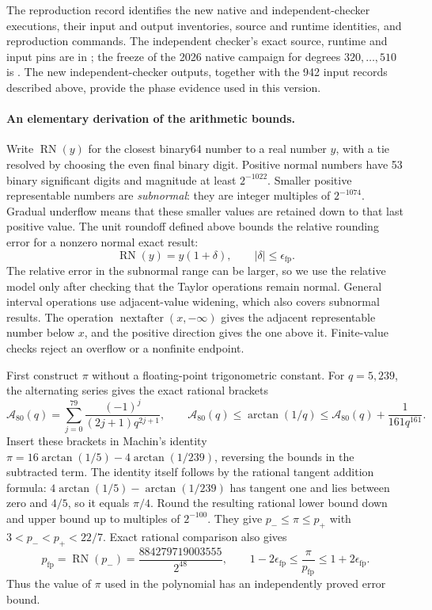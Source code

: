 The reproduction record  identifies the
new native and independent-checker executions, their input and output
inventories, source and runtime identities, and reproduction commands.
The independent checker's exact source, runtime and input pins are in
;
the freeze of the 2026 native campaign for degrees $320,\ldots,510$ is
.
The new independent-checker outputs, together with the 942 input records
described above, provide the phase evidence used in this version.

\paragraph{An elementary derivation of the arithmetic bounds.}
Write $\operatorname{RN}(y)$ for the closest binary64 number to a real
number $y$, with a tie resolved by choosing the even final binary digit.
Positive normal numbers have 53 binary significant digits and magnitude
at least $2^{-1022}$. Smaller positive representable numbers are
\emph{subnormal}: they are integer multiples of $2^{-1074}$.
Gradual underflow means that these smaller values are retained down
to that last positive value. The unit roundoff defined above bounds the relative rounding error
for a nonzero normal exact result:
\[
 \operatorname{RN}(y)=y(1+\delta),\qquad
 |\delta|\leq\epsilon_{\mathrm{fp}}.
\]
The relative error in the subnormal range can be larger, so we
use the relative model only after checking that the Taylor operations
remain normal. General interval operations use adjacent-value widening,
which also covers subnormal results. The operation
$\operatorname{nextafter}(x,-\infty)$ gives the adjacent representable
number below $x$, and the positive direction gives the one above it.
Finite-value checks reject an overflow or a nonfinite endpoint.

First construct $\pi$ without a floating-point trigonometric constant.
For $q=5,239$, the alternating series gives the exact rational brackets
\[
 \mathcal A_{80}(q)=\sum_{j=0}^{79}\frac{(-1)^j}{(2j+1)q^{2j+1}},
 \qquad
 \mathcal A_{80}(q)\leq\arctan(1/q)
 \leq \mathcal A_{80}(q)+\frac{1}{161q^{161}}.
\]
Insert these brackets in Machin's identity
$\pi=16\arctan(1/5)-4\arctan(1/239)$, reversing the bounds in
the subtracted term. The identity itself follows by the rational tangent
addition formula: $4\arctan(1/5)-\arctan(1/239)$ has tangent one
and lies between zero and $4/5$, so it equals $\pi/4$.
Round the resulting rational lower bound down and upper bound up to
multiples of $2^{-100}$. They give $p_-\leq\pi\leq p_+$ with
$3<p_-<p_+<22/7$. Exact rational comparison also gives
\[
 p_{\mathrm{fp}}=\operatorname{RN}(p_-)
     =\frac{884279719003555}{2^{48}},\qquad
 1-2\epsilon_{\mathrm{fp}}\leq\frac{\pi}{p_{\mathrm{fp}}}
                  \leq1+2\epsilon_{\mathrm{fp}}.
\]
Thus the value of $\pi$ used in the polynomial has an independently
proved error bound.


